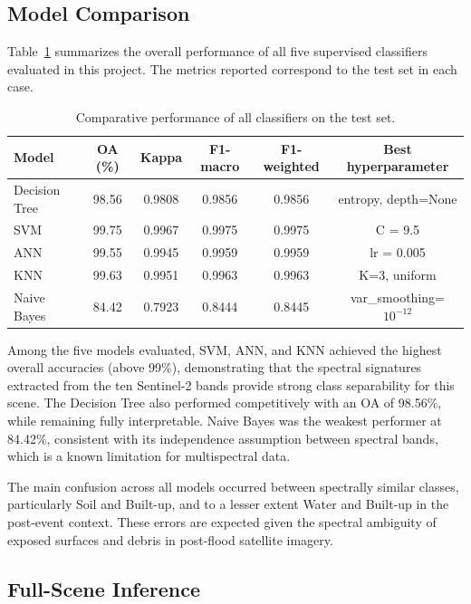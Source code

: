 \documentclass{article}
\begin{document}
\subsection{Model Comparison}

Table~\ref{tab:model_comparison} summarizes the overall performance of all five
supervised classifiers evaluated in this project. The metrics reported correspond
to the test set in each case.

\begin{table}[H]
    \centering
    \caption{Comparative performance of all classifiers on the test set.}
    \label{tab:model_comparison}
    \begin{tabular}{lccccc}
        \hline
        \textbf{Model} & \textbf{OA (\%)} & \textbf{Kappa} & \textbf{F1-macro} & \textbf{F1-weighted} & \textbf{Best hyperparameter} \\
        \hline
        Decision Tree & 98.56 & 0.9808 & 0.9856 & 0.9856 & entropy, depth=None \\
        SVM           & 99.75 & 0.9967     & 0.9975     & 0.9975     & C = 9.5 \\
        ANN           & 99.55 & 0.9945     & 0.9959     & 0.9959     & lr = 0.005 \\
        KNN           & 99.63 & 0.9951 & 0.9963 & 0.9963     & K=3, uniform \\
        Naive Bayes   & 84.42 & 0.7923 & 0.8444 & 0.8445 & var\_smoothing=$10^{-12}$ \\
        \hline
    \end{tabular}
\end{table}

Among the five models evaluated, SVM, ANN, and KNN achieved the highest overall
accuracies (above 99\%), demonstrating that the spectral signatures extracted from
the ten Sentinel-2 bands provide strong class separability for this scene. The
Decision Tree also performed competitively with an OA of 98.56\%, while remaining
fully interpretable. Naive Bayes was the weakest performer at 84.42\%, consistent
with its independence assumption between spectral bands, which is a known limitation
for multispectral data.

The main confusion across all models occurred between spectrally similar classes,
particularly Soil and Built-up, and to a lesser extent Water and Built-up in the
post-event context. These errors are expected given the spectral ambiguity of
exposed surfaces and debris in post-flood satellite imagery.

\subsection{Full-Scene Inference}
\end{document}

